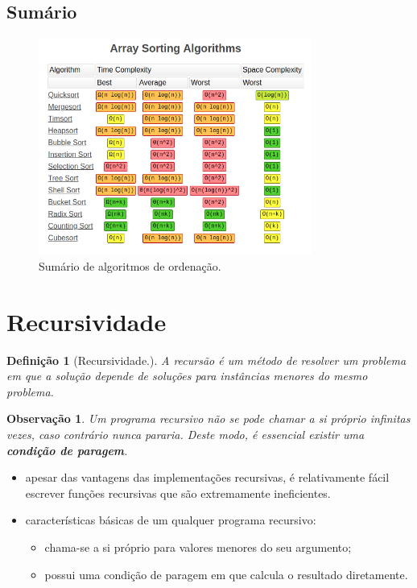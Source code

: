 \documentclass[a4paper, 12pt]{article}
\newtheorem{definition}{Definição}[section]
\newtheorem{remark}{Observação}
\begin{document}
\subsection{Sumário}

\begin{center}
    \begin{figure}[H]
        \centering
        \includegraphics[width=0.8\textwidth]{fig/ao/sumario.png}
        \caption{Sumário de algoritmos de ordenação.}
    \end{figure}
\end{center}

\newpage

\section{Recursividade}

\begin{definition}[Recursividade.]
    A recursão é um método de resolver um problema em que a solução depende de soluções para instâncias menores do mesmo problema.
\end{definition}

\begin{remark}
    Um programa recursivo não se pode chamar a si próprio infinitas vezes, caso contrário nunca pararia. Deste modo, é essencial existir uma \textbf{condição de paragem}.\end{remark}
\begin{itemize}
    \item apesar das vantagens das implementações recursivas, é relativamente fácil escrever funções recursivas que são extremamente ineficientes.
    \item características básicas de um qualquer programa recursivo:
    \begin{itemize}
        \item chama-se a si próprio para valores menores do seu argumento;
        \item possui uma condição de paragem em que calcula o resultado diretamente.
    \end{itemize}
\end{itemize}
\end{document}
